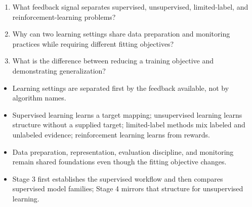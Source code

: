\begin{quickcheck}
\begin{enumerate}
  \item What feedback signal separates supervised, unsupervised, limited-label, and reinforcement-learning problems?
  \item Why can two learning settings share data preparation and monitoring practices while requiring different fitting objectives?
  \item What is the difference between reducing a training objective and demonstrating generalization?
\end{enumerate}
\end{quickcheck}

\begin{chapterrecap}
\begin{itemize}
  \item Learning settings are separated first by the feedback available, not by algorithm names.
  \item Supervised learning learns a target mapping; unsupervised learning learns structure without a supplied target; limited-label methods mix labeled and unlabeled evidence; reinforcement learning learns from rewards.
  \item Data preparation, representation, evaluation discipline, and monitoring remain shared foundations even though the fitting objective changes.
  \item Stage 3 first establishes the supervised workflow and then compares supervised model families; Stage 4 mirrors that structure for unsupervised learning.
\end{itemize}
\end{chapterrecap}
